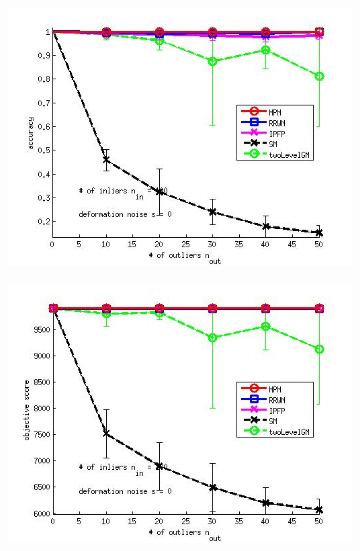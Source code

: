\begin{figure}[h] 
	\begin{subfigure}[b]{0.3\textwidth}
		\centering
		\includegraphics[scale=0.25]{"chapter3/fig/SyntheticTest/ver4.3.2/outliertest_nodeform_n50/accuracy_avg10t"} 
	\end{subfigure}%
	\begin{subfigure}[b]{0.3\textwidth}
		\centering
		\includegraphics[scale=0.25]{"chapter3/fig/SyntheticTest/ver4.3.2/outliertest_nodeform_n50/score_avg10t"} 
	\end{subfigure} 
	\begin{subfigure}[b]{0.3\textwidth}
		\centering

\end{subfigure}
\end{figure}
